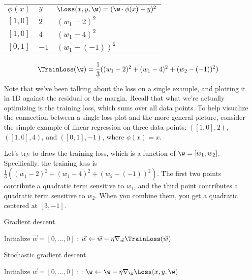 \begin{example}
	\begin{center}
		\begin{tabular}{lll}
			$\phi(x)$ & $y$ & $\Loss(x,y,\w) = (\w \cdot \phi(x)-y)^2$\\
			$[1,0]$ & $2$ & $(w_1 - 2)^2$\\
			$[1,0]$ & $4$ & $(w_1 - 4)^2$\\
			$[0,1]$ & $-1$ & $(w_1 - (-1))^2$\\
		\end{tabular}
	\end{center}

	\br

	\[
		\TrainLoss(\w) = \frac{1}{3} ((w_1 - 2)^2 + (w_1 - 4)^2 + (w_2 - (-1))^2)
	\]

	Note that we've been talking about the loss on a single example,
	and plotting it in 1D against the residual or the margin.
	Recall that what we're actually optimizing is the training loss,
	which sums over all data points.
	To help visualize the connection between a single loss plot and the more general picture,
	consider the simple example of linear regression on three data points:
	$([1, 0], 2)$, $([1, 0], 4)$, and $([0, 1], -1)$,
	where $\phi(x) = x$.

	Let's try to draw the training loss, which is a function of $\w = [w_1, w_2]$.
	Specifically, the training loss is $\frac{1}{3}((w_1 - 2)^2 + (w_1 - 4)^2 + (w_2 - (-1))^2)$.
	The first two points contribute a quadratic term sensitive to $w_1$,
	and the third point contributes a quadratic term sensitive to $w_2$.
	When you combine them, you get a quadratic centered at $[3, -1]$.
\end{example}

\label{sub:review_optimization_algorithms}

\begin{algorithm}[ht]
  \caption{Gradient descent.}
  \begin{algorithmic}
	\State Initialize $\vec{w}=[0,\ldots,0]$
	:
		\State $\vec{w} \leftarrow \vec{w} - \eta \nabla_{\vec{w}}\TrainLoss(\vec{w})$
	\EndFor
  \EndFunction
  \end{algorithmic}
\end{algorithm}

\begin{algorithm}[ht]
  \caption{Stochastic gradient descent.}
  \begin{algorithmic}
	\State Initialize $\vec{w}=[0,\ldots,0]$
    :
		:
			\State $\w \leftarrow \w - \eta \nabla_{\w} \Loss(x, y, \w)$
		\EndFor
	\EndFor
  \EndFunction
  \end{algorithmic}
\end{algorithm}

